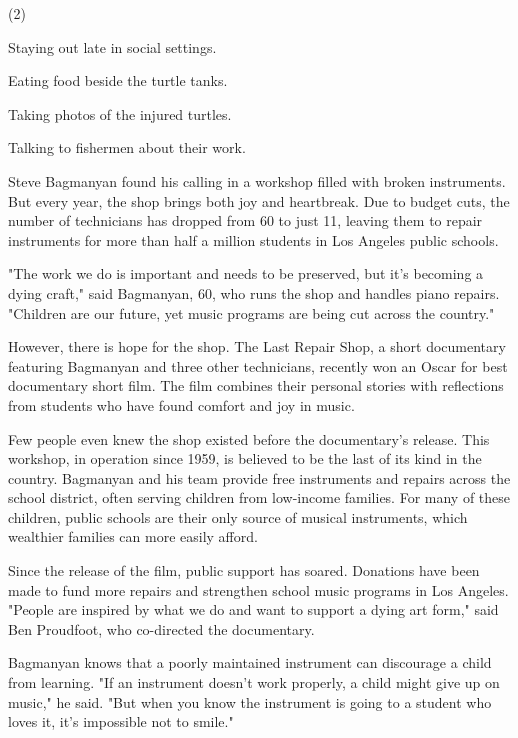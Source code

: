 \documentclass{英语试卷}
\begin{document}
\begin{choices}(2)
  \item Staying out late in social settings.
  \item Eating food beside the turtle tanks.
  \item Taking photos of the injured turtles.
  \item Talking to fishermen about their work.
\end{choices}
\par Steve Bagmanyan found his calling in a workshop filled with broken instruments. But every year, the shop brings both joy and heartbreak. Due to budget cuts, the number of technicians has dropped from 60 to just 11, leaving them to repair instruments for more than half a million students in Los Angeles public schools.\par
\par "The work we do is important and needs to be preserved, but it's becoming a dying craft," said Bagmanyan, 60, who runs the shop and handles piano repairs. "Children are our future, yet music programs are being cut across the country."\par
\par However, there is hope for the shop. The Last Repair Shop, a short documentary featuring Bagmanyan and three other technicians, recently won an Oscar for best documentary short film. The film combines their personal stories with reflections from students who have found comfort and joy in music.\par
\par Few people even knew the shop existed before the documentary's release. This workshop, in operation since 1959, is believed to be the last of its kind in the country. Bagmanyan and his team provide free instruments and repairs across the school district, often serving children from low-income families. For many of these children, public schools are their only source of musical instruments, which wealthier families can more easily afford.\par
\par Since the release of the film, public support has soared. Donations have been made to fund more repairs and strengthen school music programs in Los Angeles. "People are inspired by what we do and want to support a dying art form," said Ben Proudfoot, who co-directed the documentary.\par
\par Bagmanyan knows that a poorly maintained instrument can discourage a child from learning. "If an instrument doesn't work properly, a child might give up on music," he said. "But when you know the instrument is going to a student who loves it, it's impossible not to smile."\par
\end{document}
